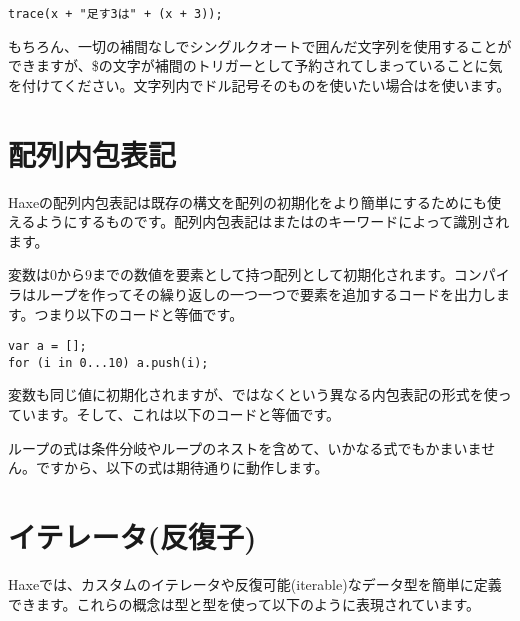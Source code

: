 \begin{lstlisting}
trace(x + "足す3は" + (x + 3));
\end{lstlisting}

もちろん、一切の補間なしでシングルクオートで囲んだ文字列を使用することができますが、\$の文字が補間のトリガーとして予約されてしまっていることに気を付けてください。文字列内でドル記号そのものを使いたい場合は\expr{\$\$}を使います。


\section{配列内包表記}
\label{lf-array-comprehension}


Haxeの配列内包表記は既存の構文を配列の初期化をより簡単にするためにも使えるようにするものです。配列内包表記はまたはのキーワードによって識別されます。


変数は0から9までの数値を要素として持つ配列として初期化されます。コンパイラはループを作ってその繰り返しの一つ一つで要素を追加するコードを出力します。つまり以下のコードと等価です。

\begin{lstlisting}
var a = [];
for (i in 0...10) a.push(i);
\end{lstlisting}

変数も同じ値に初期化されますが、ではなくという異なる内包表記の形式を使っています。そして、これは以下のコードと等価です。

ループの式は条件分岐やループのネストを含めて、いかなる式でもかまいません。ですから、以下の式は期待通りに動作します。


\section{イテレータ(反復子)}
\label{lf-iterators}

Haxeでは、カスタムのイテレータや反復可能(iterable)なデータ型を簡単に定義できます。これらの概念は型と型を使って以下のように表現されています。

